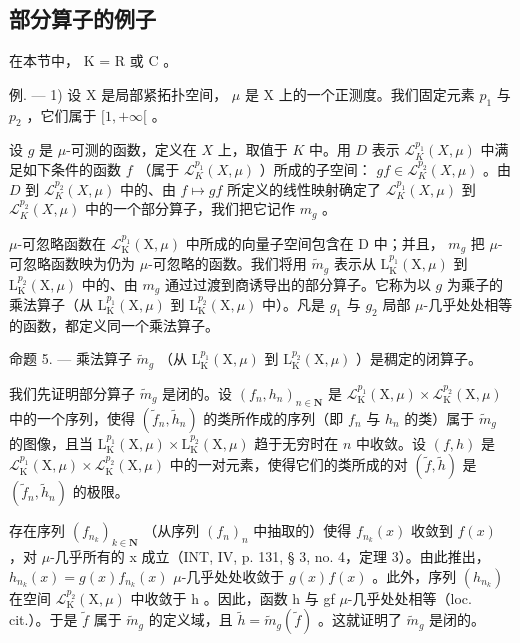 \subsection{部分算子的例子}

在本节中， K = R 或 C 。

例. --- 1) 设 X 是局部紧拓扑空间， \(\mu\) 是 X 上的一个正测度。我们固定元素 \(p_1\) 与 \(p_2\) ，它们属于 \([1, +\infty[\) 。

设 \(g\) 是 \(\mu\)-可测的函数，定义在 \(X\) 上，取值于 \(K\) 中。用 \(D\) 表示 \(\mathcal{L}_{K}^{p_1}(X, \mu)\) 中满足如下条件的函数 \(f\) （属于 \(\mathcal{L}_{K}^{p_1}(X, \mu)\) ）所成的子空间： \(gf \in \mathcal{L}_{K}^{p_2}(X, \mu)\) 。由 \(D\) 到 \(\mathcal{L}_{K}^{p_2}(X, \mu)\) 中的、由 \(f \mapsto gf\) 所定义的线性映射确定了 \(\mathcal{L}_{K}^{p_1}(X, \mu)\) 到 \(\mathcal{L}_{K}^{p_2}(X, \mu)\) 中的一个部分算子，我们把它记作 \(m_g\) 。

\(\mu\)-可忽略函数在 \(\mathcal{L}_{\mathrm{K}}^{p_1}(\mathrm{X},\mu)\) 中所成的向量子空间包含在 D 中；并且， \(m_g\) 把 \(\mu\)-可忽略函数映为仍为 \(\mu\)-可忽略的函数。我们将用 \(\tilde{m}_g\) 表示从 \(\mathrm{L}_{\mathrm{K}}^{p_1}(\mathrm{X},\mu)\) 到 \(\mathrm{L}_{\mathrm{K}}^{p_2}(\mathrm{X},\mu)\) 中的、由 \(m_g\) 通过过渡到商诱导出的部分算子。它称为以 \(g\) 为乘子的乘法算子（从 \(\mathrm{L}_{\mathrm{K}}^{p_1}(\mathrm{X},\mu)\) 到 \(\mathrm{L}_{\mathrm{K}}^{p_2}(\mathrm{X},\mu)\) 中）。凡是 \(g_1\) 与 \(g_2\) 局部 \(\mu\)-几乎处处相等的函数，都定义同一个乘法算子。

命题 5. — 乘法算子 \(\widetilde{m}_{g}\) （从 \(\mathrm{L}_{\mathrm{K}}^{p_{1}}(\mathrm{X},\mu)\) 到 \(\mathrm{L}_{\mathrm{K}}^{p_{2}}(\mathrm{X},\mu)\) ）是稠定的闭算子。

我们先证明部分算子 \(\widetilde{m}_g\) 是闭的。设 \((f_n, h_n)_{n \in \mathbf{N}}\) 是 \(\mathcal{L}_{\mathrm{K}}^{p_1}(\mathrm{X}, \mu) \times \mathcal{L}_{\mathrm{K}}^{p_2}(\mathrm{X}, \mu)\) 中的一个序列，使得 \((\widetilde{f}_n, \widetilde{h}_n)\) 的类所作成的序列（即 \(f_n\) 与 \(h_n\) 的类）属于 \(\widetilde{m}_g\) 的图像，且当 \(\mathrm{L}_{\mathrm{K}}^{p_1}(\mathrm{X}, \mu) \times \mathrm{L}_{\mathrm{K}}^{p_2}(\mathrm{X}, \mu)\) 趋于无穷时在 \(n\) 中收敛。设 \((f, h)\) 是 \(\mathcal{L}_{\mathrm{K}}^{p_1}(\mathrm{X}, \mu) \times \mathcal{L}_{\mathrm{K}}^{p_2}(\mathrm{X}, \mu)\) 中的一对元素，使得它们的类所成的对 \((\widetilde{f}, \widetilde{h})\) 是 \((\widetilde{f}_n, \widetilde{h}_n)\) 的极限。

存在序列 \((f_{n_{k}})_{k\in\mathbf{N}}\) （从序列 \((f_{n})_{n}\) 中抽取的）使得 \(f_{n_{k}}(x)\) 收敛到 \(f(x)\) ，对 \(\mu\)-几乎所有的 x 成立（INT, IV, p. 131, § 3, no. 4，定理 3）。由此推出， \(h_{n_{k}}(x)=g(x)f_{n_{k}}(x)\) \(\mu\)-几乎处处收敛于 \(g(x)f(x)\) 。此外，序列 \((h_{n_{k}})\) 在空间 \(\mathcal{L}_{\mathrm{K}}^{p_{2}}(\mathrm{X},\mu)\) 中收敛于 h 。因此，函数 h 与 gf \(\mu\)-几乎处处相等（loc. cit.）。于是 \(\widetilde{f}\) 属于 \(\widetilde{m}_{g}\) 的定义域，且 \(\widetilde{h}=\widetilde{m}_{g}(\widetilde{f})\) 。这就证明了 \(\widetilde{m}_{g}\) 是闭的。

